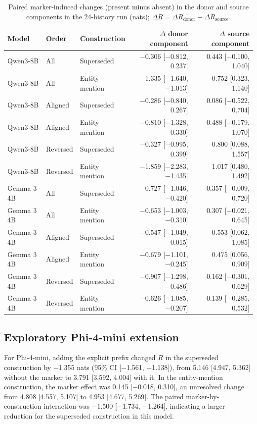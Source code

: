 \begin{table}[h]
\caption{Paired marker-induced changes (present minus absent) in the donor and source components in the 24-history run (nats); $\Delta R=\Delta R_{\text{donor}}-\Delta R_{\text{source}}$.}
\label{tab:d-paired}
\begin{center}
\small
\begin{tabular}{@{}lllrr@{}}
\toprule
Model & Order & Construction & $\Delta$ donor component & $\Delta$ source component \\
\midrule
Qwen3-8B & All & Superseded & −0.306 [−0.812, 0.237] & 0.443 [−0.100, 1.040] \\
Qwen3-8B & All & Entity mention & −1.335 [−1.640, −1.013] & 0.752 [0.323, 1.140] \\
Qwen3-8B & Aligned & Superseded & −0.286 [−0.840, 0.267] & 0.086 [−0.522, 0.704] \\
Qwen3-8B & Aligned & Entity mention & −0.810 [−1.328, −0.330] & 0.488 [−0.179, 1.070] \\
Qwen3-8B & Reversed & Superseded & −0.327 [−0.995, 0.399] & 0.800 [0.088, 1.557] \\
Qwen3-8B & Reversed & Entity mention & −1.859 [−2.283, −1.435] & 1.017 [0.480, 1.492] \\
\midrule
Gemma 3 4B & All & Superseded & −0.727 [−1.046, −0.420] & 0.357 [−0.009, 0.720] \\
Gemma 3 4B & All & Entity mention & −0.653 [−1.003, −0.310] & 0.307 [−0.021, 0.645] \\
Gemma 3 4B & Aligned & Superseded & −0.547 [−1.049, −0.015] & 0.553 [0.062, 1.085] \\
Gemma 3 4B & Aligned & Entity mention & −0.679 [−1.101, −0.245] & 0.475 [0.056, 0.909] \\
Gemma 3 4B & Reversed & Superseded & −0.907 [−1.298, −0.486] & 0.162 [−0.301, 0.629] \\
Gemma 3 4B & Reversed & Entity mention & −0.626 [−1.085, −0.207] & 0.139 [−0.285, 0.532] \\
\bottomrule
\end{tabular}
\end{center}
\end{table}

\subsection{Exploratory Phi-4-mini extension}

For Phi-4-mini, adding the explicit prefix  changed $R$ in the superseded construction by −1.355 nats (95\% CI [−1.561, −1.138]), from 5.146 [4.947, 5.362] without the marker to 3.791 [3.592, 4.004] with it. In the entity-mention construction, the marker effect was 0.145 [−0.018, 0.310], an unresolved change from 4.808 [4.557, 5.107] to 4.953 [4.677, 5.269]. The paired marker-by-construction interaction was −1.500 [−1.734, −1.264], indicating a larger reduction for the superseded construction in this model.

